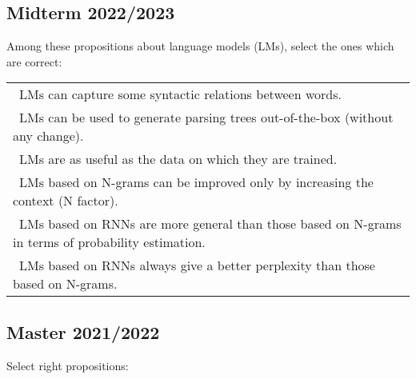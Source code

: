 \documentclass[11pt, a4paper]{article}
\begin{document}
\subsection{Midterm 2022/2023}

Among these propositions about language models (LMs), select the ones which are correct:

\begin{longtable}{|p{}|}
	\hline 
	\Square\ LMs can capture some syntactic relations between words.\\
	\Square\ LMs can be used to generate parsing trees out-of-the-box (without any change).\\
	\Square\ LMs are as useful as the data on which  they are trained.\\
	\Square\ LMs based on N-grams can be improved only by increasing the context (N factor).\\
	\Square\ LMs based on RNNs are more general than those based on N-grams in terms of probability estimation.\\
	\Square\ LMs based on RNNs always give a better perplexity than those based on N-grams.\\
	\hline
\end{longtable}

\subsection{Master 2021/2022}

Select right propositions:
\end{document}

